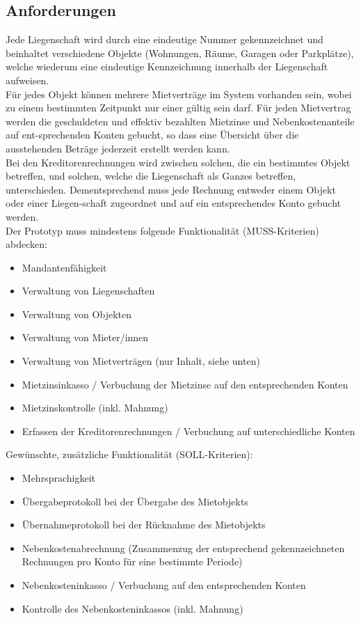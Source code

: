 \subsection{Anforderungen}
Jede Liegenschaft wird durch eine eindeutige Nummer gekennzeichnet und beinhaltet verschiedene Objekte (Wohnungen, Räume, Garagen oder Parkplätze), welche wiederum eine eindeutige Kennzeichnung innerhalb der Liegenschaft aufweisen.\\
Für jedes Objekt können mehrere Mietverträge im System vorhanden sein, wobei zu einem bestimmten Zeitpunkt nur einer gültig sein darf. Für jeden Mietvertrag werden die geschuldeten und effektiv bezahlten Mietzinse und Nebenkostenanteile auf ent-sprechenden Konten gebucht, so dass eine Übersicht über die ausstehenden Beträge jederzeit erstellt werden kann.\\
Bei den Kreditorenrechnungen wird zwischen solchen, die ein bestimmtes Objekt betreffen, und solchen, welche die Liegenschaft als Ganzes betreffen, unterschieden. Dementsprechend muss jede Rechnung entweder einem Objekt oder einer Liegen-schaft zugeordnet und auf ein entsprechendes Konto gebucht werden.\\
\newpage
Der Prototyp muss mindestens folgende Funktionalität (MUSS-Kriterien) abdecken:
\begin{itemize} \label{musskrit}
    \item Mandantenfähigkeit
    \item Verwaltung von Liegenschaften
    \item Verwaltung von Objekten
    \item Verwaltung von Mieter/innen
    \item Verwaltung von Mietverträgen (nur Inhalt, siehe unten)
    \item Mietzinsinkasso / Verbuchung der Mietzinse auf den entsprechenden Konten
    \item Mietzinskontrolle (inkl. Mahnung)
    \item Erfassen der Kreditorenrechnungen / Verbuchung auf unterschiedliche Konten
\end{itemize}

\vspace{3mm}
Gewünschte, zusätzliche Funktionalität (SOLL-Kriterien):
\begin{itemize}
    \item Mehrsprachigkeit
    \item Übergabeprotokoll bei der Übergabe des Mietobjekts
    \item Übernahmeprotokoll bei der Rücknahme des Mietobjekts
    \item Nebenkostenabrechnung (Zusammenzug der entsprechend gekennzeichneten Rechnungen pro Konto für eine bestimmte Periode)
    \item Nebenkosteninkasso / Verbuchung auf den entsprechenden Konten
    \item Kontrolle des Nebenkosteninkassos (inkl. Mahnung)
\end{itemize}

